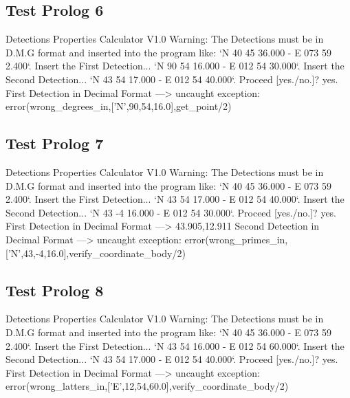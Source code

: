 \documentclass{article}
\begin{document}
\subsection*{Test Prolog 6}
	\begin{spverbatim}
		Detections Properties Calculator V1.0
		Warning: The Detections must be in D.M.G format and inserted into the program like: `N 40 45 36.000 - E 073 59 2.400`.
		Insert the First Detection...
		`N 90 54 16.000 - E 012 54 30.000`.
		Insert the Second Detection...
		`N 43 54 17.000 - E 012 54 40.000`.
		Proceed [yes./no.]?
		yes.
		First Detection in Decimal Format ---> 
		uncaught exception: error(wrong_degrees_in,['N',90,54,16.0],get_point/2)
	\end{spverbatim}

\subsection*{Test Prolog 7}
	\begin{spverbatim}
		Detections Properties Calculator V1.0
		Warning: The Detections must be in D.M.G format and inserted into the program like: `N 40 45 36.000 - E 073 59 2.400`.
		Insert the First Detection...
		`N 43 54 17.000 - E 012 54 40.000`.
		Insert the Second Detection...
		`N 43 -4 16.000 - E 012 54 30.000`.
		Proceed [yes./no.]?
		yes.
		First Detection in Decimal Format ---> 43.905,12.911
		Second Detection in Decimal Format ---> 
		uncaught exception: error(wrong_primes_in,['N',43,-4,16.0],verify_coordinate_body/2)
	\end{spverbatim}

\subsection*{Test Prolog 8}
	\begin{spverbatim}
		Detections Properties Calculator V1.0
		Warning: The Detections must be in D.M.G format and inserted into the program like: `N 40 45 36.000 - E 073 59 2.400`.
		Insert the First Detection...
		`N 43 54 16.000 - E 012 54 60.000`.
		Insert the Second Detection...
		`N 43 54 17.000 - E 012 54 40.000`.
		Proceed [yes./no.]?
		yes.
		First Detection in Decimal Format ---> 
		uncaught exception: error(wrong_latters_in,['E',12,54,60.0],verify_coordinate_body/2)
	\end{spverbatim}
\end{document}
